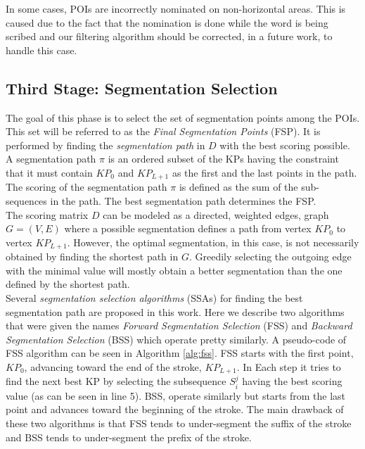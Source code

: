 \documentclass[10pt, conference, compsocconf]{IEEEtran}
\begin{document}
In some cases, POIs are incorrectly nominated on non-horizontal areas. This is caused due to the fact that the nomination is done while the word is being scribed and our filtering algorithm should be corrected, in a future work, to handle this case.\\

\subsection{Third Stage: Segmentation Selection}
The goal of this phase is to select the set of segmentation points among the POIs. 
This set will be referred to as the \emph{Final Segmentation Points} (FSP). 
It is performed by finding the \emph{segmentation path} in $D$ with the best scoring possible. 
A segmentation path $\pi$ is an ordered subset of the KPs having the constraint that it must contain $KP_{0}$ and $KP_{L+1}$ as the first and the last points in the path.
The scoring of the segmentation path $\pi$ is defined as the sum of the sub-sequences in the path. The best segmentation path determines the FSP.\\

The scoring matrix $D$ can be modeled as a directed, weighted edges, graph $G=(V,E)$ where a possible segmentation defines a path from vertex $KP_0$ to vertex $KP_{L+1}$. However, the optimal segmentation, in this case, is not necessarily obtained by finding the shortest path in $G$. Greedily selecting the outgoing edge with the minimal value will mostly obtain a better segmentation than the one defined by the shortest path.\\

Several \emph{segmentation selection algorithms} (SSAs) for finding the best segmentation path are proposed in this work.
Here we describe two algorithms that were given the names \emph{Forward Segmentation Selection} (FSS) and \emph{Backward Segmentation Selection} (BSS) which operate pretty similarly. A pseudo-code of FSS algorithm can be seen in Algorithm \ref{alg:fss}. FSS starts with the first point, $KP_0$, advancing toward the end of the stroke, $KP_{L+1}$. In Each step it tries to find the next best KP by selecting the subsequence $S_i^j$ having the best scoring value (as can be seen in line 5). BSS, operate similarly but starts from the last point and advances toward the beginning of the stroke. The main drawback of these two algorithms is that FSS tends to under-segment the suffix of the stroke and BSS tends to under-segment the prefix of the stroke.\\
\end{document}
